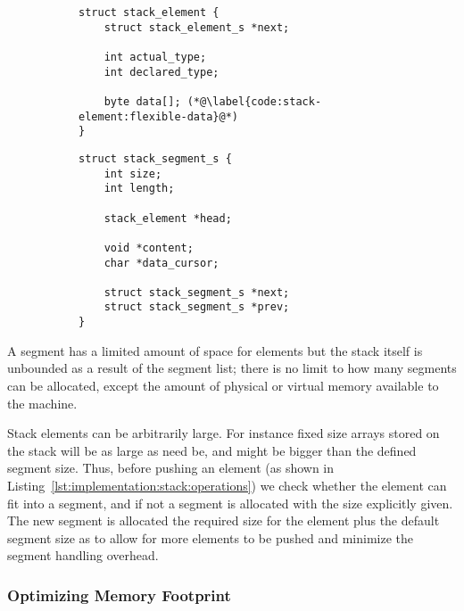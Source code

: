 \begin{figure}[h]
  \centering
  \begin{subfigure}[a]{.49\textwidth}
    \begin{lstlisting}[language={[ANSI]C},%
  caption={Structure defining the stack},%
  label={lst:implementation:stack:element}]
struct stack_element {
    struct stack_element_s *next;

    int actual_type;
    int declared_type;

    byte data[]; (*@\label{code:stack-element:flexible-data}@*)
}
    \end{lstlisting}
  \end{subfigure}
  \begin{subfigure}[a]{.49\textwidth}
    \begin{lstlisting}[language={[ANSI]C},%
  caption={Structure defining a segment of the stack},%
  label={lst:implementation:stack:segment}]
struct stack_segment_s {
    int size;
    int length;

    stack_element *head;

    void *content;
    char *data_cursor;

    struct stack_segment_s *next;
    struct stack_segment_s *prev;
}
    \end{lstlisting}
  \end{subfigure}
\end{figure}

A segment has a limited amount of space for elements but the stack itself is
unbounded as a result of the segment list; there is no limit to how many
segments can be allocated, except the amount of physical or virtual memory
available to the machine.

Stack elements can be arbitrarily large. For instance fixed size arrays stored
on the stack will be as large as need be, and might be bigger than the defined
segment size. Thus, before pushing an element (as shown in
Listing~\ref{lst:implementation:stack:operations}) we check whether the element
can fit into a segment, and if not a segment is allocated with the size
explicitly given. The new segment is allocated the required size for the element
plus the default segment size as to allow for more elements to be pushed and
minimize the segment handling overhead.

\subsubsection{Optimizing Memory Footprint}

